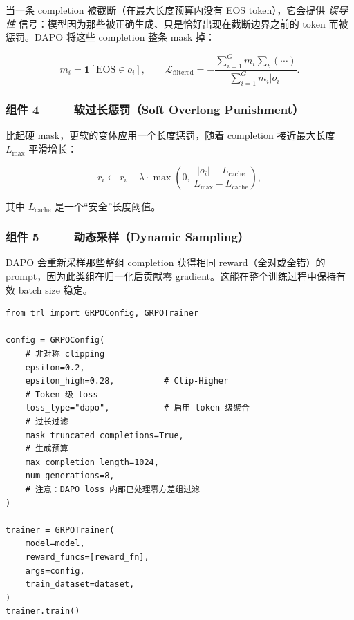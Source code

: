 当一条 completion 被截断（在最大长度预算内没有 EOS token），它会提供 \emph{误导性} 信号：模型因为那些被正确生成、只是恰好出现在截断边界之前的 token 而被惩罚。DAPO 将这些 completion 整条 mask 掉：

\[
m_i = \mathbf{1}[\text{EOS} \in o_i], \qquad
  \mathcal{L}_{\text{filtered}} =
    -\frac{\sum_{i=1}^G m_i \sum_t (\cdots)}{\sum_{i=1}^G m_i |o_i|}.
\]

\subsubsection*{组件 4 —— 软过长惩罚（Soft Overlong Punishment）}
\label{component-4-soft-overlong-punishment}

比起硬 mask，更软的变体应用一个长度惩罚，随着 completion 接近最大长度 $L_{\max}$ 平滑增长：

\[
r_i \leftarrow r_i - \lambda \cdot \max\!\left(0,\, \frac{|o_i| - L_{\text{cache}}}{L_{\max} - L_{\text{cache}}}\right),
\]

其中 $L_{\text{cache}}$ 是一个“安全”长度阈值。

\subsubsection*{组件 5 —— 动态采样（Dynamic Sampling）}
\label{component-5-dynamic-sampling}

DAPO 会重新采样那些整组 completion 获得相同 reward（全对或全错）的 prompt，因为此类组在归一化后贡献零 gradient。这能在整个训练过程中保持有效 batch size 稳定。

\begin{examplebox}
\begin{lstlisting}[style=pythonstyle]
from trl import GRPOConfig, GRPOTrainer

config = GRPOConfig(
    # 非对称 clipping
    epsilon=0.2,
    epsilon_high=0.28,          # Clip-Higher
    # Token 级 loss
    loss_type="dapo",           # 启用 token 级聚合
    # 过长过滤
    mask_truncated_completions=True,
    # 生成预算
    max_completion_length=1024,
    num_generations=8,
    # 注意：DAPO loss 内部已处理零方差组过滤
)

trainer = GRPOTrainer(
    model=model,
    reward_funcs=[reward_fn],
    args=config,
    train_dataset=dataset,
)
trainer.train()
\end{lstlisting}
\end{examplebox}

